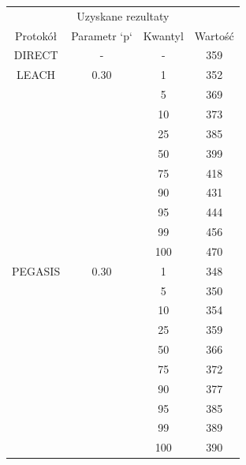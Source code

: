 \documentclass[a4paper,12pt,twoside,openany]{report}
\begin{document}
\begin{longtable}{*{4}{c}}
\toprule
\multicolumn{4}{c}{Uzyskane rezultaty} \\
Protokół	& Parametr `p`	& Kwantyl	& Wartość \\
\midrule
\endhead
DIRECT	& - 	& -	& 359 \\*
\midrule
LEACH	& 0.30	& 1	& 352 \\*
	&	& 5	& 369 \\*
	&	& 10	& 373 \\*
	&	& 25	& 385 \\*
	&	& 50	& 399 \\*
	&	& 75	& 418 \\*
	&	& 90	& 431 \\*
	&	& 95	& 444 \\*
	&	& 99	& 456 \\*
	&	& 100	& 470 \\*
\midrule
PEGASIS	& 0.30	& 1	& 348 \\*
	&	& 5	& 350 \\*
	&	& 10	& 354 \\*
	&	& 25	& 359 \\*
	&	& 50	& 366 \\*
	&	& 75	& 372 \\*
	&	& 90	& 377 \\*
	&	& 95	& 385 \\*
	&	& 99	& 389 \\*
	&	& 100	& 390 \\*
\bottomrule
\end{longtable}
\end{document}
